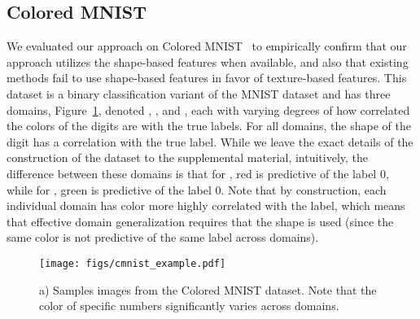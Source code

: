 


















































\subsection{Colored MNIST}

We evaluated our approach on Colored MNIST~\cite{Arjovsky:etal:ARXIV20, Gulrajani:etal:ARXIV20} to empirically confirm that our approach utilizes the shape-based features when available, and also that existing methods fail to use shape-based features in favor of texture-based features. This dataset is a binary classification variant of the MNIST dataset and has three domains, Figure~\ref{fig:cmnist}, denoted , , and , each with varying degrees of how correlated the colors of the digits are with the true labels. For all domains, the shape of the digit has a  correlation with the true label. While we leave the exact details of the construction of the dataset to the supplemental material, intuitively, the difference between these domains is that for , red is predictive of the label 0, while for , green is predictive of the label 0. Note that by construction, each individual domain has color more highly correlated with the label, which means that effective domain generalization requires that the shape is used (since the same color is not predictive of the same label across domains).






\begin{figure}[!ht]


  \begin{center}
    \texttt{[image: figs/cmnist\_example.pdf]}
    
\end{center}
\caption{a) Samples images from the Colored MNIST dataset. Note that the color of specific numbers significantly varies across domains. }
\label{fig:cmnist}
\end{figure}









